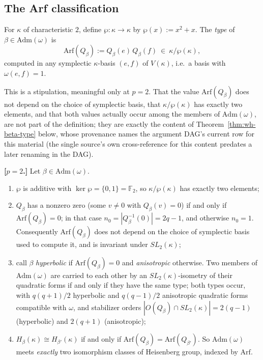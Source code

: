 \subsection{The Arf classification}

\begin{definition}
\label{def:artin-schreier}
For $\kappa$ of characteristic $2$, define $\wp:\kappa\to\kappa$ by
$\wp(x):=x^2+x$. The \emph{type} of $\beta\in\mathrm{Adm}(\omega)$ is
\[
\mathrm{Arf}(Q_\beta) := Q_\beta(e)\,Q_\beta(f) \ \in\ \kappa/\wp(\kappa),
\]
computed in any symplectic $\kappa$-basis $(e,f)$ of $V(\kappa)$, i.e.\ a
basis with $\omega(e,f)=1$.
\end{definition}

\begin{scope}
This is a stipulation, meaningful only at $p=2$. That the value
$\mathrm{Arf}(Q_\beta)$ does not depend on the choice of symplectic basis,
that $\kappa/\wp(\kappa)$ has exactly two elements, and that both values
actually occur among the members of $\mathrm{Adm}(\omega)$, are not part of
the definition; they are exactly the content of
Theorem~\ref{thm:wh-beta-type} below, whose provenance names the argument
DAG's current row for this material (the single source's own
cross-reference for this content predates a later renaming in the DAG).
\end{scope}


\statusSketch
\begin{theorem}
\label{thm:wh-beta-type}
\textbf{[$p=2$.]} Let $\beta\in\mathrm{Adm}(\omega)$.
\begin{enumerate}[label=(\roman*)]
\item $\wp$ is additive with $\ker\wp=\{0,1\}=\mathbb{F}_2$, so $\kappa/\wp(\kappa)$
has exactly two elements;
\item $Q_\beta$ has a nonzero zero (some $v\neq 0$ with $Q_\beta(v)=0$) if
and only if $\mathrm{Arf}(Q_\beta)=0$; in that case $n_0=|Q_\beta^{-1}(0)|=2q-1$,
and otherwise $n_0=1$. Consequently $\mathrm{Arf}(Q_\beta)$ does not depend
on the choice of symplectic basis used to compute it, and is invariant under
$SL_2(\kappa)$;
\item call $\beta$ \emph{hyperbolic} if $\mathrm{Arf}(Q_\beta)=0$ and
\emph{anisotropic} otherwise. Two members of $\mathrm{Adm}(\omega)$ are
carried to each other by an $SL_2(\kappa)$-isometry of their quadratic forms
if and only if they have the same type; both types occur, with $q(q+1)/2$
hyperbolic and $q(q-1)/2$ anisotropic quadratic forms compatible with
$\omega$, and stabilizer orders $|O(Q_\beta)\cap SL_2(\kappa)| = 2(q-1)$
(hyperbolic) and $2(q+1)$ (anisotropic);
\item $H_\beta(\kappa)\cong H_{\beta'}(\kappa)$ if and only if
$\mathrm{Arf}(Q_\beta)=\mathrm{Arf}(Q_{\beta'})$. So $\mathrm{Adm}(\omega)$
meets \emph{exactly} two isomorphism classes of Heisenberg group, indexed by
$\mathrm{Arf}$.
\end{enumerate}
\end{theorem}

